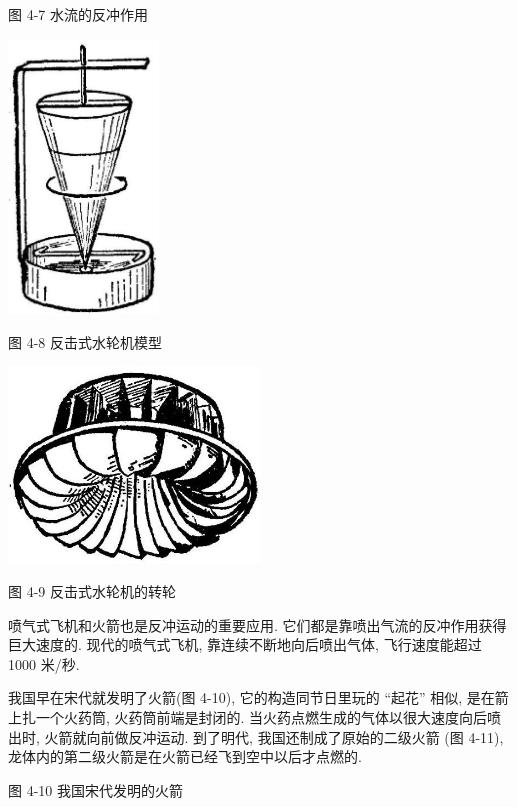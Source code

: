 \documentclass[10pt]{article}
\begin{document}
图 4-7 水流的反冲作用

\begin{center}
\includegraphics[max width=0.3\textwidth]{images/01912d55-147c-70aa-b0e0-1782a122f948_125_779427.jpg}
\end{center}

图 4-8 反击式水轮机模型

\begin{center}
\includegraphics[max width=0.5\textwidth]{images/01912d55-147c-70aa-b0e0-1782a122f948_125_567777.jpg}
\end{center}

图 4-9 反击式水轮机的转轮

喷气式飞机和火箭也是反冲运动的重要应用. 它们都是靠喷出气流的反冲作用获得巨大速度的. 现代的喷气式飞机, 靠连续不断地向后喷出气体, 飞行速度能超过 1000 米/秒.

我国早在宋代就发明了火箭(图 4-10), 它的构造同节日里玩的 “起花” 相似, 是在箭上扎一个火药筒, 火药筒前端是封闭的. 当火药点燃生成的气体以很大速度向后喷出时, 火箭就向前做反冲运动. 到了明代, 我国还制成了原始的二级火箭 (图 4-11), 龙体内的第二级火箭是在火箭已经飞到空中以后才点燃的.

图 4-10 我国宋代发明的火箭
\end{document}
